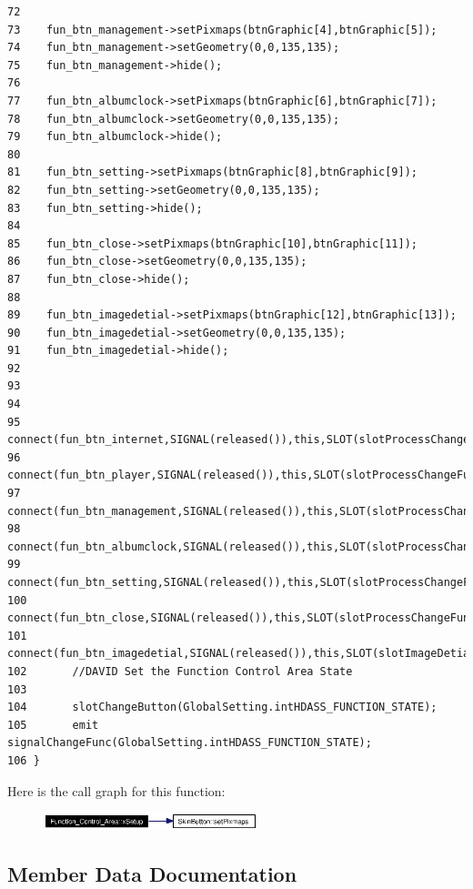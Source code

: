 \begin{verbatim}
72    
73    fun_btn_management->setPixmaps(btnGraphic[4],btnGraphic[5]);
74    fun_btn_management->setGeometry(0,0,135,135);
75    fun_btn_management->hide();
76    
77    fun_btn_albumclock->setPixmaps(btnGraphic[6],btnGraphic[7]);
78    fun_btn_albumclock->setGeometry(0,0,135,135);
79    fun_btn_albumclock->hide();
80    
81    fun_btn_setting->setPixmaps(btnGraphic[8],btnGraphic[9]);
82    fun_btn_setting->setGeometry(0,0,135,135);
83    fun_btn_setting->hide();
84    
85    fun_btn_close->setPixmaps(btnGraphic[10],btnGraphic[11]);
86    fun_btn_close->setGeometry(0,0,135,135);
87    fun_btn_close->hide();
88    
89    fun_btn_imagedetial->setPixmaps(btnGraphic[12],btnGraphic[13]);
90    fun_btn_imagedetial->setGeometry(0,0,135,135);
91    fun_btn_imagedetial->hide();
92    
93    
94    
95    connect(fun_btn_internet,SIGNAL(released()),this,SLOT(slotProcessChangeFunc()));
96     connect(fun_btn_player,SIGNAL(released()),this,SLOT(slotProcessChangeFunc()));
97      connect(fun_btn_management,SIGNAL(released()),this,SLOT(slotProcessChangeFunc()));
98       connect(fun_btn_albumclock,SIGNAL(released()),this,SLOT(slotProcessChangeFunc()));
99        connect(fun_btn_setting,SIGNAL(released()),this,SLOT(slotProcessChangeFunc()));
100         connect(fun_btn_close,SIGNAL(released()),this,SLOT(slotProcessChangeFunc()));
101         connect(fun_btn_imagedetial,SIGNAL(released()),this,SLOT(slotImageDetial()));
102       //DAVID Set the Function Control Area State
103       
104       slotChangeButton(GlobalSetting.intHDASS_FUNCTION_STATE);
105       emit signalChangeFunc(GlobalSetting.intHDASS_FUNCTION_STATE);
106 }
\end{verbatim}\normalsize 


Here is the call graph for this function:\begin{figure}[H]
\begin{center}
\leavevmode
\includegraphics[width=176pt]{classFunction__Control__Area_Function__Control__Areaa1_cgraph}
\end{center}
\end{figure}


\subsection{Member Data Documentation}
